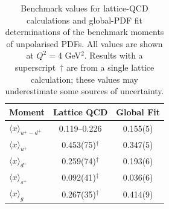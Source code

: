 %
%
%


\begin{table}[t]
\centering
\begin{tabular}{lcc}
\toprule
Moment & Lattice QCD & Global Fit\\
\midrule
$\langle x \rangle_{u^+ -d^+}$ 
& \numrange{0.119}{0.226} 
& 0.155(5)\\
$\langle x \rangle_{u^+}$     
& 0.453(75)$^\dagger$ 
& 0.347(5)\\
$\langle x \rangle_{d^+}$     
& 0.259(74)$^\dagger$ 
& 0.193(6)\\
$\langle x \rangle_{s^+}$     
& 0.092(41)$^\dagger$ 
& 0.036(6)\\
$\langle x\rangle_{g}$       
& 0.267(35)$^\dagger$ 
& 0.414(9)\\
\bottomrule
\end{tabular}
\caption{\small Benchmark values for lattice-QCD calculations and global-PDF 
fit determinations of the benchmark moments of unpolarised PDFs.
%
All values are shown at $Q^2=4$ GeV$^2$.
%
Results with a superscript~$\dagger$ are from a single lattice 
calculation; these values may underestimate some sources of uncertainty.}
\label{tab:LQCDunpol}
\end{table}


